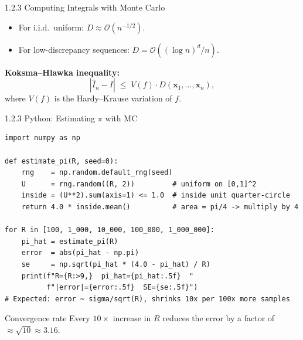 \documentclass[aspectratio=169,10pt]{beamer}
\begin{document}
\begin{frame}[allowframebreaks]{1.2.3 Computing Integrals with Monte Carlo}
  \begin{itemize}
    \item For i.i.d.\ uniform: $D \approx \mathcal{O}(n^{-1/2})$.
    \item For low-discrepancy sequences: $D = \mathcal{O}((\log n)^d / n)$.
  \end{itemize}

  \textbf{Koksma--Hlawka inequality:}
  \[
    \left|\hat{I}_n - I\right| \;\le\; V(f)\cdot D(\mathbf{x}_1,\ldots,\mathbf{x}_n),
  \]
  where $V(f)$ is the Hardy--Krause variation of $f$.

\end{frame}

\begin{frame}[fragile]{1.2.3 Python: Estimating $\pi$ with MC}

\begin{lstlisting}[style=python, caption={Classic pi estimation via MC}]
import numpy as np

def estimate_pi(R, seed=0):
    rng    = np.random.default_rng(seed)
    U      = rng.random((R, 2))         # uniform on [0,1]^2
    inside = (U**2).sum(axis=1) <= 1.0  # inside unit quarter-circle
    return 4.0 * inside.mean()          # area = pi/4 -> multiply by 4

for R in [100, 1_000, 10_000, 100_000, 1_000_000]:
    pi_hat = estimate_pi(R)
    error  = abs(pi_hat - np.pi)
    se     = np.sqrt(pi_hat * (4.0 - pi_hat) / R)
    print(f"R={R:>9,}  pi_hat={pi_hat:.5f}  "
          f"|error|={error:.5f}  SE={se:.5f}")
# Expected: error ~ sigma/sqrt(R), shrinks 10x per 100x more samples
\end{lstlisting}

  \begin{exampleblock}{Convergence rate}
    Every $10\times$ increase in $R$ reduces the error by a factor of
    $\approx\!\sqrt{10} \approx 3.16$.
  \end{exampleblock}

\end{frame}
\end{document}
